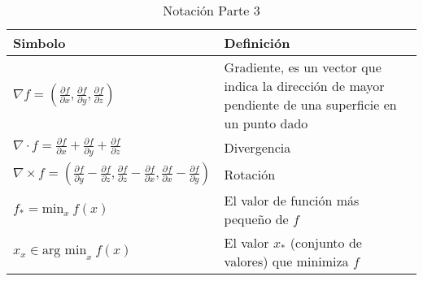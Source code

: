 \begin{table}[H]
    \begin{center}
        \begin{tabularx}{\textwidth}{|l|X|}
            \hline
            \textbf{Simbolo}                                                                                                                                                                                                                  & \textbf{Definición}                                                                                   \\
            \hline
            $ \nabla f = \left( \frac{\partial f}{\partial x}, \frac{\partial f}{\partial y}, \frac{\partial f}{\partial z} \right) $                                                                                                         & Gradiente, es un vector que indica la dirección de mayor pendiente de una superficie en un punto dado \\
            $ \nabla \cdot f =  \frac{\partial f}{\partial x} + \frac{\partial f}{\partial y} + \frac{\partial f}{\partial z} $                                                                                                               & Divergencia                                                                                           \\
            $ \nabla \times f =  \left( \frac{\partial f}{\partial y} - \frac{\partial f}{\partial z}, \frac{\partial f}{\partial z} - \frac{\partial f}{\partial x}, \frac{\partial f}{\partial x} - \frac{\partial f}{\partial y}  \right)$ & Rotación                                                                                              \\
            $ f_{*} = \text{min}_x~f(x) $                                                                                                                                                                                                     & El valor de función más pequeño de $f$                                                                \\
            $ {x}_x \in \text{arg min}_{x}~f(x) $                                                                                                                                                                                             & El valor $x_{*}$ (conjunto de valores) que minimiza $f$                                               \\
            \hline
        \end{tabularx}
        \caption{Notación Parte 3}
        \label{tab:nnotation-part-3}
    \end{center}
\end{table}


